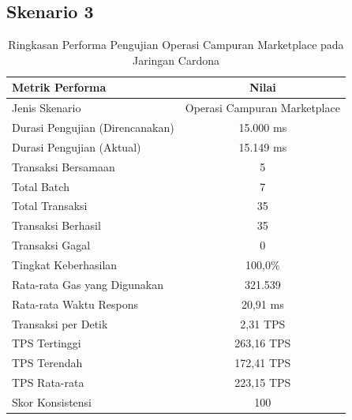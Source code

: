 \subsection{Skenario 3}
\begin{table}[h!]
  \centering
  \begin{tabular}{|l|c|}
    \hline
    \textbf{Metrik Performa}        & \textbf{Nilai}               \\
    \hline
    Jenis Skenario                  & Operasi Campuran Marketplace \\
    \hline
    Durasi Pengujian (Direncanakan) & 15.000 ms                    \\
    \hline
    Durasi Pengujian (Aktual)       & 15.149 ms                    \\
    \hline
    Transaksi Bersamaan             & 5                            \\
    \hline
    Total Batch                     & 7                            \\
    \hline
    Total Transaksi                 & 35                           \\
    \hline
    Transaksi Berhasil              & 35                           \\
    \hline
    Transaksi Gagal                 & 0                            \\
    \hline
    Tingkat Keberhasilan            & 100,0\%                      \\
    \hline
    Rata-rata Gas yang Digunakan    & 321.539                      \\
    \hline
    Rata-rata Waktu Respons         & 20,91 ms                     \\
    \hline
    Transaksi per Detik             & 2,31 TPS                     \\
    \hline
    TPS Tertinggi                   & 263,16 TPS                   \\
    \hline
    TPS Terendah                    & 172,41 TPS                   \\
    \hline
    TPS Rata-rata                   & 223,15 TPS                   \\
    \hline
    Skor Konsistensi                & 100                          \\
    \hline
  \end{tabular}
  \caption{Ringkasan Performa Pengujian Operasi Campuran Marketplace pada Jaringan Cardona}
  \label{tab:mixed_operations_summary}
\end{table}
